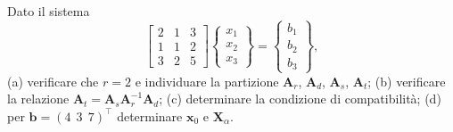 \begin{esercizio} 
	Dato il sistema
	\begin{equation*}
		\begin{bmatrix} 2 & 1 & 3 \\ 1 & 1 & 2 \\ 3 & 2 & 5 \end{bmatrix}
		\begin{Bmatrix} x_1 \\ x_2 \\ x_3 \end{Bmatrix}
		= \begin{Bmatrix} b_1 \\ b_2 \\ b_3 \end{Bmatrix},
	\end{equation*}
	(a) verificare che $r=2$ e individuare la partizione
	$\bm{A}_r$, $\bm{A}_d$, $\bm{A}_s$, $\bm{A}_t$;
	(b) verificare la relazione
	$\bm{A}_t=\bm{A}_s\bm{A}_r^{-1}\bm{A}_d$;
	(c) determinare la condizione di compatibilit\`a;
	(d) per $\bm{b}=(4\,\;3\,\;7)^\top$ determinare $\bm{x}_0$ e
	$\bm{X}_\alpha$.
\end{esercizio}
